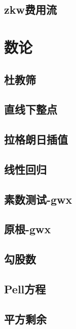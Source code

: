\documentclass[titlepage,a4paper,10pt]{article}
\begin{document}
\begin{multicols}{2}
\begin{spacing}{0.8}
			\subsection{zkw费用流}
				
		\section{数论}
			\subsection{杜教筛}
				
			\subsection{直线下整点}
				
			\subsection{拉格朗日插值}
				
			\subsection{线性回归}
				
			\subsection{素数测试-gwx}
				
			\subsection{原根-gwx}
				
			\subsection{勾股数}
				
			\subsection{Pell方程}
				
			\subsection{平方剩余}
				

\end{spacing}
\end{multicols}
\end{document}
